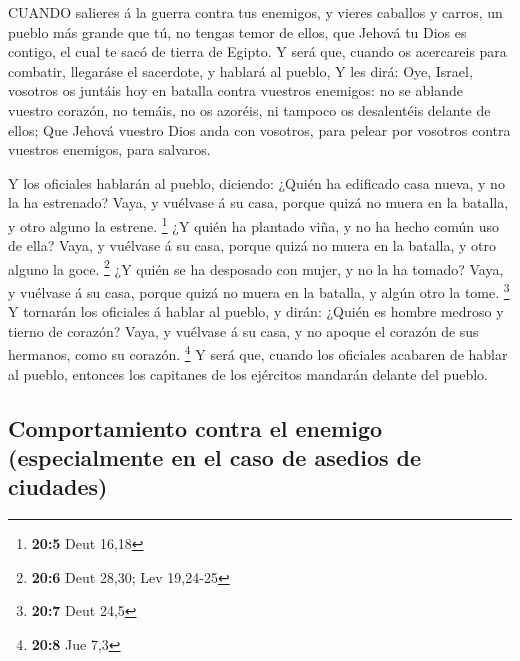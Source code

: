  CUANDO salieres á la guerra contra tus enemigos, y vieres
caballos y carros, un pueblo más grande que tú, no tengas temor de
ellos, que Jehová tu Dios es contigo, el cual te sacó de tierra de
Egipto.  Y será que, cuando os acercareis para combatir,
llegaráse el sacerdote, y hablará al pueblo,  Y les dirá:
Oye, Israel, vosotros os juntáis hoy en batalla contra vuestros
enemigos: no se ablande vuestro corazón, no temáis, no os azoréis, ni
tampoco os desalentéis delante de ellos;  Que Jehová vuestro
Dios anda con vosotros, para pelear por vosotros contra vuestros
enemigos, para salvaros.

 Y los oficiales hablarán al pueblo, diciendo: ¿Quién ha
edificado casa nueva, y no la ha estrenado? Vaya, y vuélvase á su casa,
porque quizá no muera en la batalla, y otro alguno la estrene.
\footnote{\textbf{20:5} Deut 16,18}  ¿Y quién ha plantado
viña, y no ha hecho común uso de ella? Vaya, y vuélvase á su casa,
porque quizá no muera en la batalla, y otro alguno la goce. \footnote{\textbf{20:6}
  Deut 28,30; Lev 19,24-25}  ¿Y quién se ha desposado con
mujer, y no la ha tomado? Vaya, y vuélvase á su casa, porque quizá no
muera en la batalla, y algún otro la tome. \footnote{\textbf{20:7} Deut
  24,5}  Y tornarán los oficiales á hablar al pueblo, y
dirán: ¿Quién es hombre medroso y tierno de corazón? Vaya, y vuélvase á
su casa, y no apoque el corazón de sus hermanos, como su corazón.
\footnote{\textbf{20:8} Jue 7,3}  Y será que, cuando los
oficiales acabaren de hablar al pueblo, entonces los capitanes de los
ejércitos mandarán delante del pueblo.

\hypertarget{comportamiento-contra-el-enemigo-especialmente-en-el-caso-de-asedios-de-ciudades}{%
\subsection{Comportamiento contra el enemigo (especialmente en el caso
de asedios de
ciudades)}\label{comportamiento-contra-el-enemigo-especialmente-en-el-caso-de-asedios-de-ciudades}}

